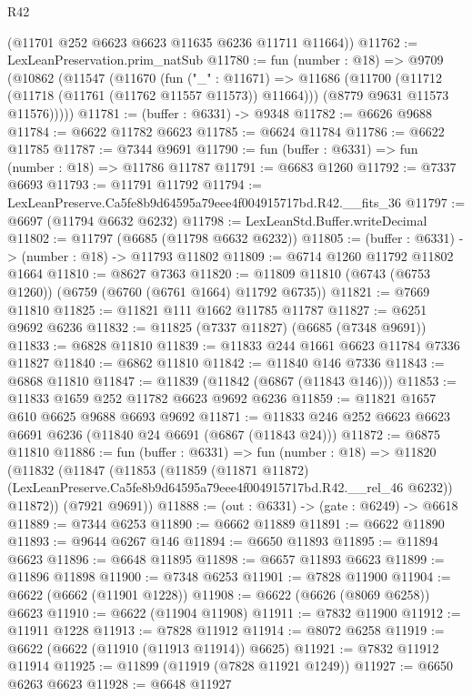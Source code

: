 \begin{lexlean}{R42}
\begin{coremodule}
{      (@11701 @252 @6623 @6623 @11635 @6236 @11711 @11664))
@11762 := LexLeanPreservation.prim_natSub
@11780 := fun (number : @18) =>
  @9709
    (@10862
      (@11547
        (@11670
          (fun ("_" : @11671) =>
          @11686
            (@11700 (@11712 (@11718 (@11761 (@11762 @11557 @11573)) @11664)))
            (@8779 @9631 @11573 @11576)))))
@11781 := (buffer : @6331) -> @9348
@11782 := @6626 @9688
@11784 := @6622 @11782 @6623
@11785 := @6624 @11784
@11786 := @6622 @11785
@11787 := @7344 @9691
@11790 := fun (buffer : @6331) => fun (number : @18) => @11786 @11787
@11791 := @6683 @1260
@11792 := @7337 @6693
@11793 := @11791 @11792
@11794 := LexLeanPreserve.Ca5fe8b9d64595a79eee4f004915717bd.R42.__fits_36
@11797 := @6697 (@11794 @6632 @6232)
@11798 := LexLeanStd.Buffer.writeDecimal
@11802 := @11797 (@6685 (@11798 @6632 @6232))
@11805 := (buffer : @6331) -> (number : @18) -> @11793 @11802
@11809 := @6714 @1260 @11792 @11802 @1664
@11810 := @8627 @7363
@11820 := @11809 @11810 (@6743 (@6753 @1260)) (@6759 (@6760 (@6761 @1664) @11792 @6735))
@11821 := @7669 @11810
@11825 := @11821 @111 @1662 @11785 @11787
@11827 := @6251 @9692 @6236
@11832 := @11825 (@7337 @11827) (@6685 (@7348 @9691))
@11833 := @6828 @11810
@11839 := @11833 @244 @1661 @6623 @11784 @7336 @11827
@11840 := @6862 @11810
@11842 := @11840 @146 @7336
@11843 := @6868 @11810
@11847 := @11839 (@11842 (@6867 (@11843 @146)))
@11853 := @11833 @1659 @252 @11782 @6623 @9692 @6236
@11859 := @11821 @1657 @610 @6625 @9688 @6693 @9692
@11871 := @11833 @246 @252 @6623 @6623 @6691 @6236 (@11840 @24 @6691 (@6867 (@11843 @24)))
@11872 := @6875 @11810
@11886 := fun (buffer : @6331) =>
  fun (number : @18) =>
  @11820
    (@11832
      (@11847
        (@11853
          (@11859
            (@11871 @11872)
            (LexLeanPreserve.Ca5fe8b9d64595a79eee4f004915717bd.R42.__rel_46 @6232))
          @11872))
      (@7921 @9691))
@11888 := (out : @6331) -> (gate : @6249) -> @6618
@11889 := @7344 @6253
@11890 := @6662 @11889
@11891 := @6622 @11890
@11893 := @9644 @6267 @146
@11894 := @6650 @11893
@11895 := @11894 @6623
@11896 := @6648 @11895
@11898 := @6657 @11893 @6623
@11899 := @11896 @11898
@11900 := @7348 @6253
@11901 := @7828 @11900
@11904 := @6622 (@6662 (@11901 @1228))
@11908 := @6622 (@6626 (@8069 @6258)) @6623
@11910 := @6622 (@11904 @11908)
@11911 := @7832 @11900
@11912 := @11911 @1228
@11913 := @7828 @11912
@11914 := @8072 @6258
@11919 := @6622 (@6622 (@11910 (@11913 @11914)) @6625)
@11921 := @7832 @11912 @11914
@11925 := @11899 (@11919 (@7828 @11921 @1249))
@11927 := @6650 @6263 @6623
@11928 := @6648 @11927
}
\end{coremodule}
\end{lexlean}
